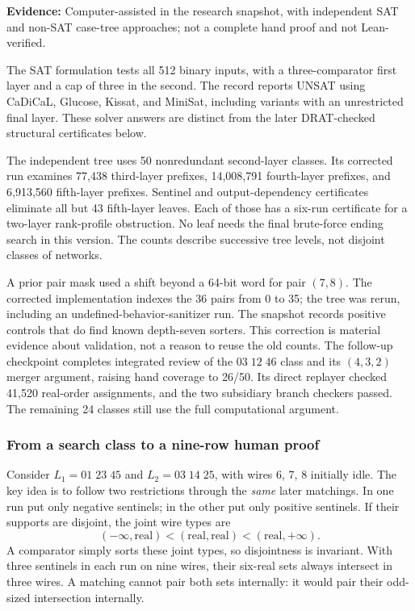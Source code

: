 \documentclass[11pt]{article}
\newcommand{\status}[1]{\textbf{Evidence:} #1.}
\begin{document}
\status{Computer-assisted in the research snapshot, with independent SAT and non-SAT case-tree approaches; not a complete hand proof and not Lean-verified}

The SAT formulation tests all 512 binary inputs, with a three-comparator first layer and a cap of three in the second. The record reports UNSAT using CaDiCaL, Glucose, Kissat, and MiniSat, including variants with an unrestricted final layer. These solver answers are distinct from the later DRAT-checked structural certificates below.

The independent tree uses 50 nonredundant second-layer classes. Its corrected run examines 77,438 third-layer prefixes, 14,008,791 fourth-layer prefixes, and 6,913,560 fifth-layer prefixes. Sentinel and output-dependency certificates eliminate all but 43 fifth-layer leaves. Each of those has a six-run certificate for a two-layer rank-profile obstruction. No leaf needs the final brute-force ending search in this version. The counts describe successive tree levels, not disjoint classes of networks.

A prior pair mask used a shift beyond a 64-bit word for pair $(7,8)$. The corrected implementation indexes the 36 pairs from 0 to 35; the tree was rerun, including an undefined-behavior-sanitizer run. The snapshot records positive controls that do find known depth-seven sorters. This correction is material evidence about validation, not a reason to reuse the old counts. The follow-up checkpoint completes integrated review of the $03\;12\;46$ class and its $(4,3,2)$ merger argument, raising hand coverage to 26/50. Its direct replayer checked 41,520 real-order assignments, and the two subsidiary branch checkers passed. The remaining 24 classes still use the full computational argument.

\subsubsection*{From a search class to a nine-row human proof}
Consider $L_1=01\;23\;45$ and $L_2=03\;14\;25$, with wires 6, 7, 8 initially idle. The key idea is to follow two restrictions through the \emph{same} later matchings. In one run put only negative sentinels; in the other put only positive sentinels. If their supports are disjoint, the joint wire types are
\[
(-\infty,\text{real})< (\text{real},\text{real}) <(\text{real},+\infty).
\]
A comparator simply sorts these joint types, so disjointness is invariant. With three sentinels in each run on nine wires, their six-real sets always intersect in three wires. A matching cannot pair both sets internally: it would pair their odd-sized intersection internally.
\end{document}
